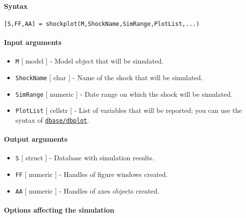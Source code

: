 


	\paragraph{Syntax}\label{syntax}

\begin{verbatim}
[S,FF,AA] = shockplot(M,ShockName,SimRange,PlotList,...)
\end{verbatim}

\paragraph{Input arguments}\label{input-arguments}

\begin{itemize}
\item
  \texttt{M} {[} model {]} - Model object that will be simulated.
\item
  \texttt{ShockName} {[} char {]} - Name of the shock that will be
  simulated.
\item
  \texttt{SimRange} {[} numeric {]} - Date range on which the shock will
  be simulated.
\item
  \texttt{PlotList} {[} cellstr {]} - List of variables that will be
  reported; you can use the syntax of
  \href{dbase/dbplot}{\texttt{dbase/dbplot}}.
\end{itemize}

\paragraph{Output arguments}\label{output-arguments}

\begin{itemize}
\item
  \texttt{S} {[} struct {]} - Database with simulation results.
\item
  \texttt{FF} {[} numeric {]} - Handles of figure windows created.
\item
  \texttt{AA} {[} numeric {]} - Handles of axes objects created.
\end{itemize}

\paragraph{Options affecting the
simulation}\label{options-affecting-the-simulation}

